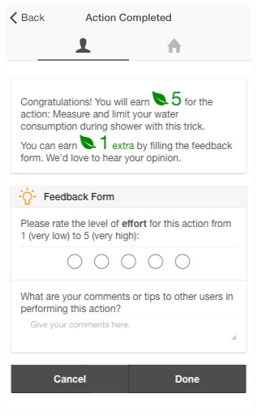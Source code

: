 \begin{figure}
      \begin{center}
        \begin{minipage}[t!]{0.4\linewidth}
	       \includegraphics[width=1\linewidth]{img/action_completed.jpg}
           \vspace{2.75cm}
        \end{minipage}
        \begin{minipage}[t!]{0.4\linewidth}    

\end{minipage}
\end{center}
\end{figure}
